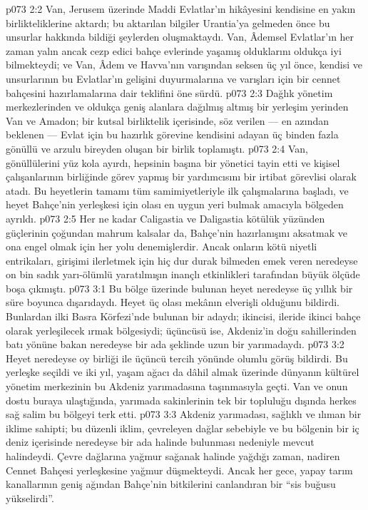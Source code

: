 \vs p073 2:2 Van, Jerusem üzerinde Maddi Evlatlar’ın hikâyesini kendisine en yakın birlikteliklerine aktardı; bu aktarılan bilgiler Urantia’ya gelmeden önce bu unsurlar hakkında bildiği şeylerden oluşmaktaydı. Van, Âdemsel Evlatlar’ın her zaman yalın ancak cezp edici bahçe evlerinde yaşamış olduklarını oldukça iyi bilmekteydi; ve Van, Âdem ve Havva’nın varışından seksen üç yıl önce, kendisi ve unsurlarının bu Evlatlar’ın gelişini duyurmalarına ve varışları için bir cennet bahçesini hazırlamalarına dair teklifini öne sürdü.
\vs p073 2:3 Dağlık yönetim merkezlerinden ve oldukça geniş alanlara dağılmış altmış bir yerleşim yerinden Van ve Amadon; bir kutsal birliktelik içerisinde, söz verilen --- en azından beklenen --- Evlat için bu hazırlık görevine kendisini adayan üç binden fazla gönüllü ve arzulu bireyden oluşan bir birlik toplamıştı.
\vs p073 2:4 Van, gönüllülerini yüz kola ayırdı, hepsinin başına bir yönetici tayin etti ve kişisel çalışanlarının birliğinde görev yapmış bir yardımcısını bir irtibat görevlisi olarak atadı. Bu heyetlerin tamamı tüm samimiyetleriyle ilk çalışmalarına başladı, ve heyet Bahçe’nin yerleşkesi için olası en uygun yeri bulmak amacıyla bölgeden ayrıldı.
\vs p073 2:5 Her ne kadar Caligastia ve Daligastia kötülük yüzünden güçlerinin çoğundan mahrum kalsalar da, Bahçe’nin hazırlanışını aksatmak ve ona engel olmak için her yolu denemişlerdir. Ancak onların kötü niyetli entrikaları, girişimi ilerletmek için hiç dur durak bilmeden emek veren neredeyse on bin sadık yarı\hyp{}ölümlü yaratılmışın inançlı etkinlikleri tarafından büyük ölçüde boşa çıkmıştı.
\vs p073 3:1 Bu bölge üzerinde bulunan heyet neredeyse üç yıllık bir süre boyunca dışarıdaydı. Heyet üç olası mekânın elverişli olduğunu bildirdi. Bunlardan ilki Basra Körfezi’nde bulunan bir adaydı; ikincisi, ileride ikinci bahçe olarak yerleşilecek ırmak bölgesiydi; üçüncüsü ise, Akdeniz’in doğu sahillerinden batı yönüne bakan neredeyse bir ada şeklinde uzun bir yarımadaydı.
\vs p073 3:2 Heyet neredeyse oy birliği ile üçüncü tercih yönünde olumlu görüş bildirdi. Bu yerleşke seçildi ve iki yıl, yaşam ağacı da dâhil almak üzerinde dünyanın kültürel yönetim merkezinin bu Akdeniz yarımadasına taşınmasıyla geçti. Van ve onun dostu buraya ulaştığında, yarımada sakinlerinin tek bir topluluğu dışında herkes sağ salim bu bölgeyi terk etti.
\vs p073 3:3 Akdeniz yarımadası, sağlıklı ve ılıman bir iklime sahipti; bu düzenli iklim, çevreleyen dağlar sebebiyle ve bu bölgenin bir iç deniz içerisinde neredeyse bir ada halinde bulunması nedeniyle mevcut halindeydi. Çevre dağlarına yağmur sağanak halinde yağdığı zaman, nadiren Cennet Bahçesi yerleşkesine yağmur düşmekteydi. Ancak her gece, yapay tarım kanallarının geniş ağından Bahçe’nin bitkilerini canlandıran bir “sis buğusu yükselirdi”.
